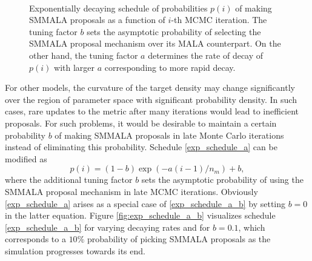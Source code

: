 \documentclass[twoside,11pt]{article}
\begin{document}
\begin{figure}[t]
	\centering
	 \\
	\caption{Exponentially decaying schedule of probabilities $p(i)$ of making SMMALA proposals as a function of
	$i$-th MCMC iteration. The tuning factor $b$ sets the asymptotic probability of selecting the SMMALA proposal mechanism
	over its MALA counterpart. On the other hand, the tuning factor $a$ determines the rate of decay of $p(i)$ with larger 
	$a$ corresponding to more rapid decay.
	}
	\label{fig:exp_schedule}
\end{figure}

For other models, the curvature of the target density may change significantly over the region of parameter space with 
significant probability density. In such cases, rare updates to the metric after many iterations would lead to inefficient 
proposals. For such problems, it would be desirable to maintain a certain probability $b$ of making SMMALA proposals in late 
Monte Carlo iterations instead of eliminating this probability. Schedule \eqref{exp_schedule_a} can be modified as
\begin{equation}
\label{exp_schedule_a_b}
p(i)=(1-b)\exp{(-a(i-1)/n_m)}+b,
\end{equation}
where the additional tuning factor $b$ sets the asymptotic probability of using the SMMALA proposal mechanism in late MCMC
iterations. Obviously \eqref{exp_schedule_a} arises as a special case of \eqref{exp_schedule_a_b} by setting $b=0$ in the 
latter equation. Figure \ref{fig:exp_schedule_a_b} visualizes schedule \eqref{exp_schedule_a_b} for varying decaying rates 
and for $b=0.1$, which corresponds to a $10\%$ probability of picking SMMALA proposals as the simulation progresses towards 
its end.
\end{document}
